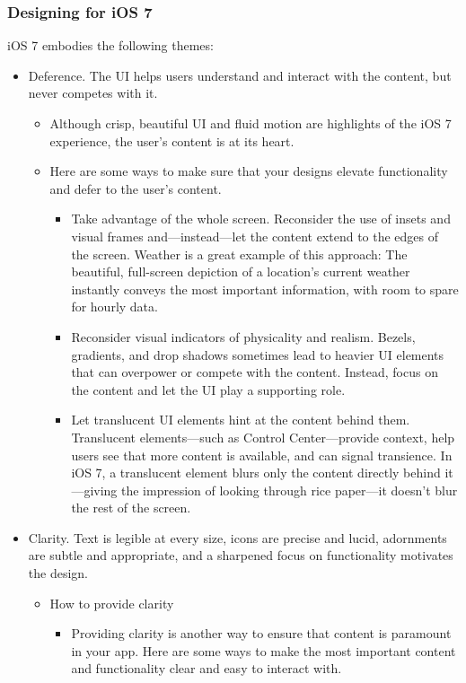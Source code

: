 \subsubsection*{Designing for iOS 7}
iOS 7 embodies the following themes:
\begin{itemize}
\item Deference. The UI helps users understand and interact with the content, but never competes with it.
	\begin{itemize}
    \item Although crisp, beautiful UI and fluid motion are highlights of the iOS 7 experience, the user’s content is at its heart.
	\item Here are some ways to make sure that your designs elevate functionality and defer to the user’s content.
		\begin{itemize}
		\item Take advantage of the whole screen. Reconsider the use of insets and visual frames and—instead—let the content extend to the edges of the screen. Weather is a great example of this approach: The beautiful, full-screen depiction of a location’s current weather instantly conveys the most important information, with room to spare for hourly data.
		\item Reconsider visual indicators of physicality and realism. Bezels, gradients, and drop shadows sometimes lead to heavier UI elements that can overpower or compete with the content. Instead, focus on the content and let the UI play a supporting role.
		\item Let translucent UI elements hint at the content behind them. Translucent elements—such as Control Center—provide context, help users see that more content is available, and can signal transience. In iOS 7, a translucent element blurs only the content directly behind it—giving the impression of looking through rice paper—it doesn’t blur the rest of the screen.
		\end{itemize}
	\end{itemize}
\newpage
\item Clarity. Text is legible at every size, icons are precise and lucid, adornments are subtle and appropriate, and a sharpened focus on functionality motivates the design.
	\begin{itemize}
	\item How to provide clarity
		\begin{itemize}
		\item Providing clarity is another way to ensure that content is paramount in your app. Here are some ways to make the most important content and functionality clear and easy to interact with.

\end{itemize}
\end{itemize}
\end{itemize}
